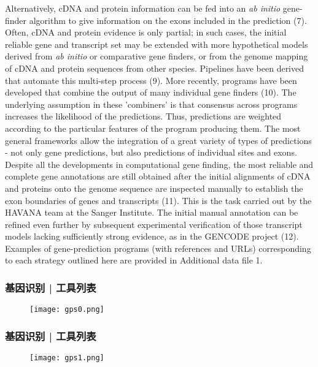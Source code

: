 {Alternatively, cDNA and protein information can be fed into an \textit{ab initio} gene-finder algorithm to give information on the exons included in the prediction (7). 
Often, cDNA and protein evidence is only partial; in such cases, the initial reliable gene and transcript set may be extended with more hypothetical models derived from \textit{ab initio} or comparative gene finders, or from the genome mapping of cDNA and protein sequences from other species. Pipelines have been derived that automate this multi-step process (9). 
More recently, programs have been developed that combine the output of many individual gene finders (10). The underlying assumption in these 'combiners' is that consensus across programs increases the likelihood of the predictions. Thus, predictions are weighted according to the particular features of the program producing them. The most general frameworks allow the integration of a great variety of types of predictions - not only gene predictions, but also predictions of individual sites and exons.
Despite all the developments in computational gene finding, the most reliable and complete gene annotations are still obtained after the initial alignments of cDNA and proteins onto the genome sequence are inspected manually to establish the exon boundaries of genes and transcripts (11). This is the task carried out by the HAVANA team at the Sanger Institute.
The initial manual annotation can be refined even further by subsequent experimental verification of those transcript models lacking sufficiently strong evidence, as in the GENCODE project (12).
Examples of gene-prediction programs (with references and URLs) corresponding to each strategy outlined here are provided in Additional data file 1.
}

\begin{frame}
  \frametitle{基因识别 | 工具列表}
  \begin{figure}
    \centering
    \texttt{[image: gps0.png]}
  \end{figure}
\end{frame}

\begin{frame}
  \frametitle{基因识别 | 工具列表}
  \begin{figure}
    \centering
    \texttt{[image: gps1.png]}
  \end{figure}
\end{frame}

